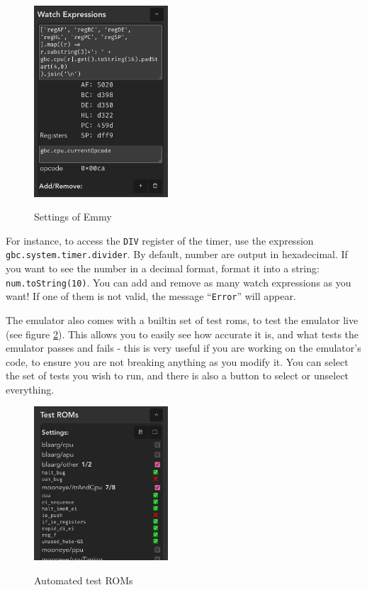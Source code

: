 \begin{figure}[h]
    \centering
    \includegraphics[width=5cm]{images/watch-expressions}\\
    \caption{Settings of Emmy}
    \label{fig:watch-expressions}
\end{figure}

For instance, to access the \texttt{DIV} register of the timer, use the expression \texttt{gbc.system.timer.divider}. By default, number are output in hexadecimal. If you want to see the number in a decimal format, format it into a string: \texttt{num.toString(10)}. You can add and remove as many watch expressions as you want! If one of them is not valid, the message ``\texttt{Error}'' will appear.

The emulator  also comes with a builtin set of test \glspl{rom}, to test the emulator live (see figure \ref{fig:test-roms}). This allows you to easily see how accurate it is, and what tests the emulator passes and fails - this is very useful if you are working on the emulator's code, to ensure you are not breaking anything as you modify it. You can select the set of tests you wish to run, and there is also a button to select or unselect everything.

\begin{figure}[h]
    \centering
    \includegraphics[width=5cm]{images/test-roms}\\
    \caption{Automated test ROMs}
    \label{fig:test-roms}
\end{figure}

